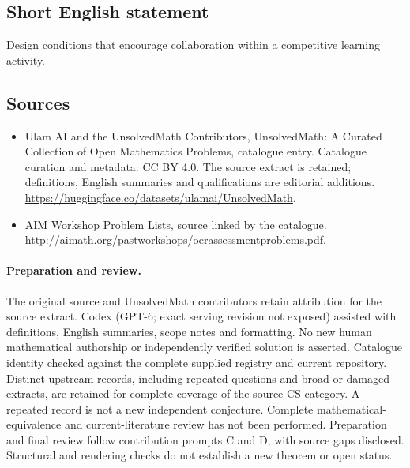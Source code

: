 \documentclass[11pt]{article}
\begin{document}
\subsection{Short English statement}
Design conditions that encourage collaboration within a competitive learning activity.
\subsection{Sources}
\begin{itemize}
\item[\hypertarget{source:statement:1}{S1}] Ulam AI and the UnsolvedMath Contributors, UnsolvedMath: A Curated Collection of Open Mathematics Problems, catalogue entry. Catalogue curation and metadata: CC BY 4.0. The source extract is retained; definitions, English summaries and qualifications are editorial additions.
\url{https://huggingface.co/datasets/ulamai/UnsolvedMath}.
\item[\hypertarget{source:statement:2}{S2}] AIM Workshop Problem Lists, source linked by the catalogue.
\url{http://aimath.org/pastworkshops/oerassessmentproblems.pdf}.
\end{itemize}
\paragraph{Preparation and review.}
The original source and UnsolvedMath contributors retain attribution for the source extract. Codex (GPT-6; exact serving revision not exposed) assisted with definitions, English summaries, scope notes and formatting. No new human mathematical authorship or independently verified solution is asserted. Catalogue identity checked against the complete supplied registry and current repository. Distinct upstream records, including repeated questions and broad or damaged extracts, are retained for complete coverage of the source CS category. A repeated record is not a new independent conjecture. Complete mathematical-equivalence and current-literature review has not been performed. Preparation and final review follow contribution prompts C and D, with source gaps disclosed. Structural and rendering checks do not establish a new theorem or open status.
\label{end:statement}
\end{document}
